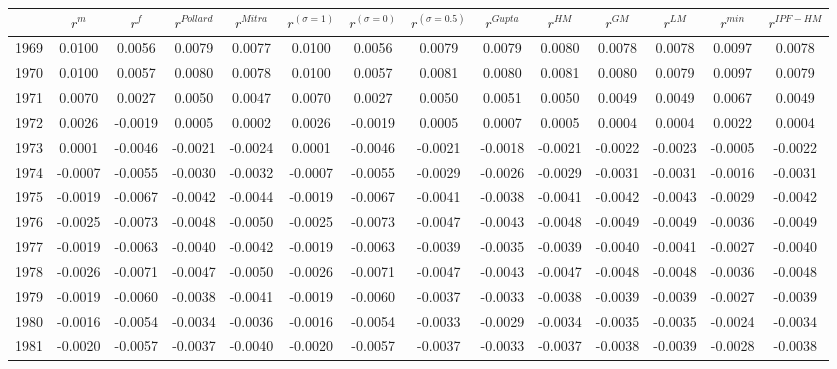 \begin{tabular}{cccccccccccccc}
  \hline
 & $r^m$ & $r^f$ & $r^{Pollard}$ & $r^{Mitra}$ & $r^{(\sigma = 1)}$ & $r^{(\sigma = 0)}$ & $r^{(\sigma = 0.5)}$ & $r^{Gupta}$ & $r^{HM}$ & $r^{GM}$ & $r^{LM}$ & $r^{min}$ & $r^{IPF-HM}$ \\ 
  \hline
1969 & 0.0100 & 0.0056 & 0.0079 & 0.0077 & 0.0100 & 0.0056 & 0.0079 & 0.0079 & 0.0080 & 0.0078 & 0.0078 & 0.0097 & 0.0078 \\ 
  1970 & 0.0100 & 0.0057 & 0.0080 & 0.0078 & 0.0100 & 0.0057 & 0.0081 & 0.0080 & 0.0081 & 0.0080 & 0.0079 & 0.0097 & 0.0079 \\ 
  1971 & 0.0070 & 0.0027 & 0.0050 & 0.0047 & 0.0070 & 0.0027 & 0.0050 & 0.0051 & 0.0050 & 0.0049 & 0.0049 & 0.0067 & 0.0049 \\ 
  1972 & 0.0026 & -0.0019 & 0.0005 & 0.0002 & 0.0026 & -0.0019 & 0.0005 & 0.0007 & 0.0005 & 0.0004 & 0.0004 & 0.0022 & 0.0004 \\ 
  1973 & 0.0001 & -0.0046 & -0.0021 & -0.0024 & 0.0001 & -0.0046 & -0.0021 & -0.0018 & -0.0021 & -0.0022 & -0.0023 & -0.0005 & -0.0022 \\ 
  1974 & -0.0007 & -0.0055 & -0.0030 & -0.0032 & -0.0007 & -0.0055 & -0.0029 & -0.0026 & -0.0029 & -0.0031 & -0.0031 & -0.0016 & -0.0031 \\ 
  1975 & -0.0019 & -0.0067 & -0.0042 & -0.0044 & -0.0019 & -0.0067 & -0.0041 & -0.0038 & -0.0041 & -0.0042 & -0.0043 & -0.0029 & -0.0042 \\ 
  1976 & -0.0025 & -0.0073 & -0.0048 & -0.0050 & -0.0025 & -0.0073 & -0.0047 & -0.0043 & -0.0048 & -0.0049 & -0.0049 & -0.0036 & -0.0049 \\ 
  1977 & -0.0019 & -0.0063 & -0.0040 & -0.0042 & -0.0019 & -0.0063 & -0.0039 & -0.0035 & -0.0039 & -0.0040 & -0.0041 & -0.0027 & -0.0040 \\ 
  1978 & -0.0026 & -0.0071 & -0.0047 & -0.0050 & -0.0026 & -0.0071 & -0.0047 & -0.0043 & -0.0047 & -0.0048 & -0.0048 & -0.0036 & -0.0048 \\ 
  1979 & -0.0019 & -0.0060 & -0.0038 & -0.0041 & -0.0019 & -0.0060 & -0.0037 & -0.0033 & -0.0038 & -0.0039 & -0.0039 & -0.0027 & -0.0039 \\ 
  1980 & -0.0016 & -0.0054 & -0.0034 & -0.0036 & -0.0016 & -0.0054 & -0.0033 & -0.0029 & -0.0034 & -0.0035 & -0.0035 & -0.0024 & -0.0034 \\ 
  1981 & -0.0020 & -0.0057 & -0.0037 & -0.0040 & -0.0020 & -0.0057 & -0.0037 & -0.0033 & -0.0037 & -0.0038 & -0.0039 & -0.0028 & -0.0038 \\ 

\end{tabular}
